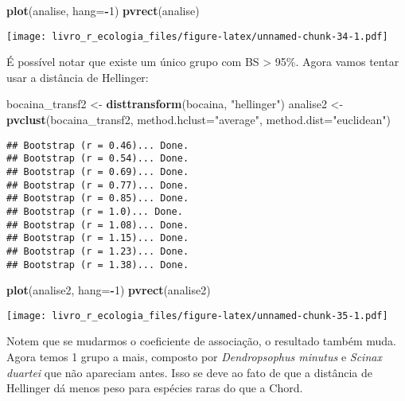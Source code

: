\documentclass[
]{book}
\newenvironment{Shaded}{\begin{snugshade}}{\end{snugshade}}
\newcommand{\DataTypeTok}[1]{\textcolor[rgb]{0.13,0.29,0.53}{#1}}
\newcommand{\DecValTok}[1]{\textcolor[rgb]{0.00,0.00,0.81}{#1}}
\newcommand{\KeywordTok}[1]{\textcolor[rgb]{0.13,0.29,0.53}{\textbf{#1}}}
\newcommand{\NormalTok}[1]{#1}
\newcommand{\OperatorTok}[1]{\textcolor[rgb]{0.81,0.36,0.00}{\textbf{#1}}}
\newcommand{\StringTok}[1]{\textcolor[rgb]{0.31,0.60,0.02}{#1}}
\begin{document}
\begin{Shaded}
\begin{Highlighting}[]
\KeywordTok{plot}\NormalTok{(analise, }\DataTypeTok{hang=}\OperatorTok{-}\DecValTok{1}\NormalTok{)}
\KeywordTok{pvrect}\NormalTok{(analise)}
\end{Highlighting}
\end{Shaded}

\texttt{[image: livro\_r\_ecologia\_files/figure-latex/unnamed-chunk-34-1.pdf]}

É possível notar que existe um único grupo com BS \textgreater{} 95\%. Agora vamos tentar usar a distância de Hellinger:

\begin{Shaded}
\begin{Highlighting}[]
\NormalTok{bocaina_transf2 <-}\StringTok{ }\KeywordTok{disttransform}\NormalTok{(bocaina, }\StringTok{"hellinger"}\NormalTok{)}
\NormalTok{analise2 <-}\StringTok{ }\KeywordTok{pvclust}\NormalTok{(bocaina_transf2, }\DataTypeTok{method.hclust=}\StringTok{"average"}\NormalTok{, }\DataTypeTok{method.dist=}\StringTok{"euclidean"}\NormalTok{) }
\end{Highlighting}
\end{Shaded}

\begin{verbatim}
## Bootstrap (r = 0.46)... Done.
## Bootstrap (r = 0.54)... Done.
## Bootstrap (r = 0.69)... Done.
## Bootstrap (r = 0.77)... Done.
## Bootstrap (r = 0.85)... Done.
## Bootstrap (r = 1.0)... Done.
## Bootstrap (r = 1.08)... Done.
## Bootstrap (r = 1.15)... Done.
## Bootstrap (r = 1.23)... Done.
## Bootstrap (r = 1.38)... Done.
\end{verbatim}

\begin{Shaded}
\begin{Highlighting}[]
\KeywordTok{plot}\NormalTok{(analise2, }\DataTypeTok{hang=}\OperatorTok{-}\DecValTok{1}\NormalTok{)}
\KeywordTok{pvrect}\NormalTok{(analise2)}
\end{Highlighting}
\end{Shaded}

\texttt{[image: livro\_r\_ecologia\_files/figure-latex/unnamed-chunk-35-1.pdf]}

Notem que se mudarmos o coeficiente de associação, o resultado também muda. Agora temos 1 grupo a mais, composto por \emph{Dendropsophus minutus} e \emph{Scinax duartei} que não apareciam antes. Isso se deve ao fato de que a distância de Hellinger dá menos peso para espécies raras do que a Chord.
\end{document}
